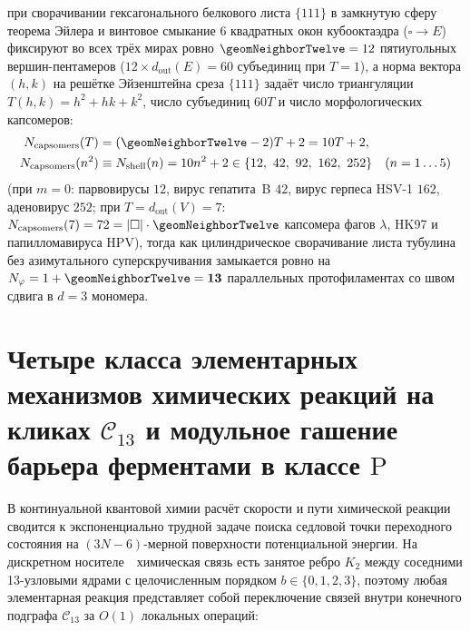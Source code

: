 \begin{theorem}[Мембранные потенциалы и окна фотосинтеза трёх миров $m\in\{-1,0,+1\}$, капсидные сферы $10T+2$ и цилиндр микротрубочки $N_\varphi = 13$]
\begin{enumerate}[leftmargin=*]
  при сворачивании гексагонального белкового листа $\{111\}$ в замкнутую сферу теорема Эйлера и винтовое смыкание $6$ квадратных окон кубооктаэдра ($\square \to E$) фиксируют во всех трёх мирах ровно $\geomNeighborTwelve = 12$ пятиугольных вершин-пентамеров ($12\times d_{\mathrm{out}}(E) = 60$ субъединиц при $T=1$), а норма вектора $(h,k)$ на решётке Эйзенштейна среза $\{111\}$ задаёт число триангуляции $T(h,k) = h^2 + hk + k^2$, число субъединиц $60T$ и число морфологических капсомеров:
  \begin{equation}
  \label{eq:bio-caspar-klug-shells}
  \begin{aligned}
    N_{\mathrm{capsomers}}(T) &= (\geomNeighborTwelve - 2)T + 2 = 10T + 2,\\
    N_{\mathrm{capsomers}}(n^2) &\equiv N_{\mathrm{shell}}(n) = 10n^2 + 2 \in \{12,\ 42,\ 92,\ 162,\ 252\}\quad (n=1\ldots 5)
  \end{aligned}
  \end{equation}
  (при $m=0$: парвовирусы $12$, вирус гепатита~B $42$, вирус герпеса HSV-1 $162$, аденовирус $252$; при $T = d_{\mathrm{out}}(V) = 7$: $N_{\mathrm{capsomers}}(7) = 72 = |\square|\cdot\geomNeighborTwelve$ капсомера фагов $\lambda$, HK97 и папилломавируса HPV), тогда как цилиндрическое сворачивание листа тубулина без азимутального суперскручивания замыкается ровно на $N_\varphi = 1 + \geomNeighborTwelve = \mathbf{13}$ параллельных протофиламентах со швом сдвига в $d = 3$ мономера.
\end{enumerate}
\end{theorem}

\section{Четыре класса элементарных механизмов химических реакций на кликах \texorpdfstring{$\mathcal{C}_{13}$}{C\_13} и модульное гашение барьера ферментами в классе \texorpdfstring{$\mathrm{P}$}{P}}
\label{sec:bio-chemical-reactions-in-p}

В континуальной квантовой химии расчёт скорости и пути химической реакции сводится к экспоненциально трудной задаче поиска седловой точки переходного состояния на $(3N-6)$-мерной поверхности потенциальной энергии.
На дискретном носителе~\latGCKshort\ химическая связь есть занятое ребро $K_2$ между соседними 13-узловыми ядрами с целочисленным порядком $b\in\{0,1,2,3\}$, поэтому любая элементарная реакция представляет собой переключение связей внутри конечного подграфа $\mathcal{C}_{13}$ за $O(1)$ локальных операций:

